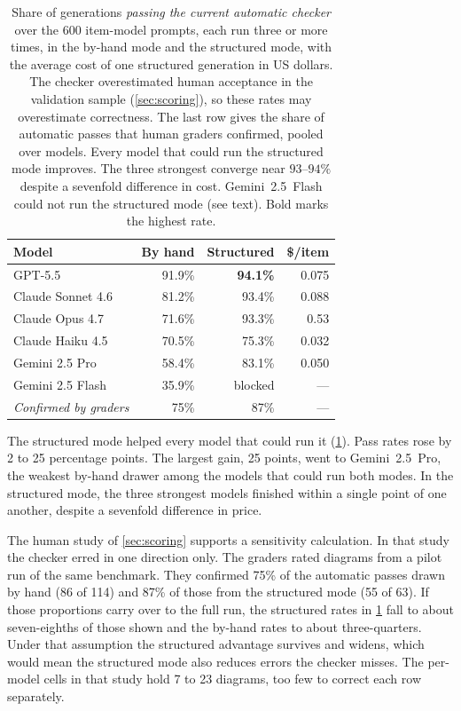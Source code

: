 \begin{table}[t]
\centering
\footnotesize
\setlength{\tabcolsep}{5pt}
\begin{tabular}{@{}lrrr@{}}
\toprule
\textbf{Model} & \textbf{By hand} & \textbf{Structured} & \textbf{\$/item}\\
\midrule
GPT-5.5            & 91.9\% & \textbf{94.1\%} & 0.075\\
Claude Sonnet 4.6  & 81.2\% & 93.4\% & 0.088\\
Claude Opus 4.7    & 71.6\% & 93.3\% & 0.53\\
Claude Haiku 4.5   & 70.5\% & 75.3\% & 0.032\\
Gemini 2.5 Pro     & 58.4\% & 83.1\% & 0.050\\
Gemini 2.5 Flash   & 35.9\% & blocked & ---\\
\midrule
\emph{Confirmed by graders} & 75\% & 87\% & ---\\
\bottomrule
\end{tabular}
\caption{Share of generations \emph{passing the current automatic checker} over the $600$ item-model prompts, each run three or more times, in the by-hand mode and the structured mode, with the average cost of one structured generation in US dollars. The checker overestimated human acceptance in the validation sample (\cref{sec:scoring}), so these rates may overestimate correctness. The last row gives the share of automatic passes that human graders confirmed, pooled over models. Every model that could run the structured mode improves. The three strongest converge near $93$--$94\%$ despite a sevenfold difference in cost. Gemini~2.5~Flash could not run the structured mode (see text). Bold marks the highest rate.}
\label{tab:results}
\end{table}

The structured mode helped every model that could run it (\cref{tab:results}). Pass rates rose by 2 to 25 percentage points. The largest gain, 25 points, went to Gemini~2.5~Pro, the weakest by-hand drawer among the models that could run both modes. In the structured mode, the three strongest models finished within a single point of one another, despite a sevenfold difference in price.

The human study of \cref{sec:scoring} supports a sensitivity calculation. In that study the checker erred in one direction only. The graders rated diagrams from a pilot run of the same benchmark. They confirmed 75\% of the automatic passes drawn by hand (86 of 114) and 87\% of those from the structured mode (55 of 63). If those proportions carry over to the full run, the structured rates in \cref{tab:results} fall to about seven-eighths of those shown and the by-hand rates to about three-quarters. Under that assumption the structured advantage survives and widens, which would mean the structured mode also reduces errors the checker misses. The per-model cells in that study hold 7 to 23 diagrams, too few to correct each row separately.

